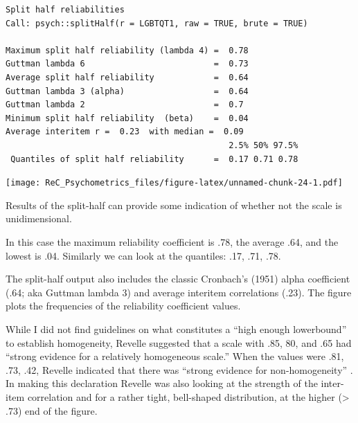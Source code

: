 \documentclass[
  english,
]{book}
\newenvironment{Shaded}{\begin{snugshade}}{\end{snugshade}}
\newcommand{\AttributeTok}[1]{\textcolor[rgb]{0.77,0.63,0.00}{#1}}
\newcommand{\DecValTok}[1]{\textcolor[rgb]{0.00,0.00,0.81}{#1}}
\newcommand{\FunctionTok}[1]{\textcolor[rgb]{0.00,0.00,0.00}{#1}}
\newcommand{\NormalTok}[1]{#1}
\newcommand{\SpecialCharTok}[1]{\textcolor[rgb]{0.00,0.00,0.00}{#1}}
\newcommand{\StringTok}[1]{\textcolor[rgb]{0.31,0.60,0.02}{#1}}
\begin{document}
\begin{verbatim}
Split half reliabilities  
Call: psych::splitHalf(r = LGBTQT1, raw = TRUE, brute = TRUE)

Maximum split half reliability (lambda 4) =  0.78
Guttman lambda 6                          =  0.73
Average split half reliability            =  0.64
Guttman lambda 3 (alpha)                  =  0.64
Guttman lambda 2                          =  0.7
Minimum split half reliability  (beta)    =  0.04
Average interitem r =  0.23  with median =  0.09
                                             2.5% 50% 97.5%
 Quantiles of split half reliability      =  0.17 0.71 0.78
\end{verbatim}

\begin{Shaded}
\end{Shaded}

\texttt{[image: ReC\_Psychometrics\_files/figure-latex/unnamed-chunk-24-1.pdf]}

Results of the split-half can provide some indication of whether not the scale is unidimensional.

In this case the maximum reliability coefficient is .78, the average .64, and the lowest is .04. Similarly we can look at the quantiles: .17, .71, .78.

The split-half output also includes the classic Cronbach's (1951) alpha coefficient (.64; aka Guttman lambda 3) and average interitem correlations (.23). The figure plots the frequencies of the reliability coefficient values.

While I did not find guidelines on what constitutes a ``high enough lowerbound'' to establish homogeneity, Revelle suggested that a scale with .85, 80, and .65 had ``strong evidence for a relatively homogeneous scale.'' When the values were .81, .73, .42, Revelle indicated that there was ``strong evidence for non-homogeneity'' \citep[p.~11]{revelle_reliability_2019}. In making this declaration Revelle was also looking at the strength of the inter-item correlation and for a rather tight, bell-shaped distribution, at the higher (\textgreater{} .73) end of the figure.
\end{document}

